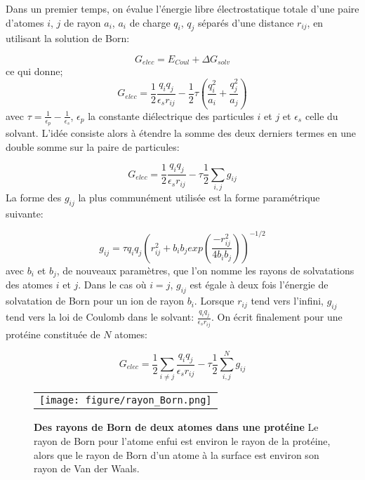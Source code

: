 Dans un premier temps, on évalue l'énergie libre électrostatique totale d'une paire d'atomes $i$, $j$ de rayon $a_i$, $a_i$ de charge $q_i$, $q_j$ séparés d'une distance $r_{ij}$, en utilisant la solution de Born:


\begin{equation}
  \label{eq:GB}
  G_{elec} =  E_{Coul} + \Delta G_{solv}
\end{equation}
ce qui donne;
\begin{equation}
  \label{eq:GB}
 G_{elec} =  \frac{1}{2}  \frac{q_iq_j}{\epsilon_s r_{ij}} - \frac{1}{2}  \tau ( \frac{q_i^2}{a_i} +  \frac{q_j^2}{a_j})
\end{equation}
avec $ \tau = \frac{1}{\epsilon_p} - \frac{1}{\epsilon_s}$, $\epsilon_p$ la constante diélectrique des particules $i$ et $j$ et $\epsilon_s$ celle du solvant. L'idée consiste alors à étendre la somme des deux derniers termes en une double somme sur la paire de particules:

\begin{equation}
  G_{elec} = \frac{1}{2} \frac{q_iq_j}{\epsilon_s r_{ij}} - \tau \frac{1}{2} \sum_{i,j} g_{ij}
\end{equation}
La forme des $g_{ij}$ la plus communément utilisée est la forme paramétrique suivante:


\begin{equation}
  \label{eq:GBg}
  g_{ij}= \tau q_iq_j (r^2_{ij} + b_ib_j exp(\frac{-r^2_{ij}}{4b_ib_j}))^{-1/2} 
\end{equation}
avec $b_i$ et $b_j$, de nouveaux paramètres, que l'on nomme les rayons de solvatations des atomes $i$ et $j$. Dans le cas où $i=j$, $g_{ij}$ est égale à deux fois l'énergie de solvatation de Born pour un ion de rayon $b_i$. Lorsque $r_{ij}$ tend vers l'infini, $g_{ij}$ tend vers la loi de Coulomb dans le solvant: $\frac{q_iq_j}{\epsilon_s r_{ij}}$. On écrit finalement pour une protéine constituée de $N$ atomes:

\begin{equation}
  G_{elec} = \frac{1}{2} \sum_{i \neq j} \frac{q_iq_j}{\epsilon_sr_{ij}} - \tau \frac{1}{2} \sum_{i,j}^N g_{ij}
\end{equation}



   \begin{figure}[!htbp]
     \centering
     \begin{tabular}{c}
       \texttt{[image: figure/rayon\_Born.png]} &
     \end{tabular}
     
     \caption{\textbf{Des rayons de Born de deux atomes dans une protéine} Le rayon de Born pour l'atome enfui est environ le rayon de la protéine, alors que le rayon de Born d'un atome à la surface est environ son rayon de Van der Waals.} 
\label{graph:rayonBorn}
   \end{figure}



